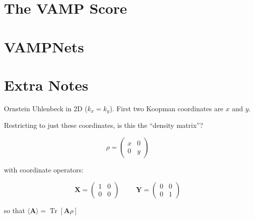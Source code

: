 \documentclass[]{article}
\newcommand{\bk}[1]{\left[ #1 \right]}
\newcommand{\w}[1]{\mathbf{#1}}
\DeclareMathOperator\Tr{Tr}
\begin{document}

\section{The VAMP Score}
\section{VAMPNets}
\section{Extra Notes}

Ornstein Uhlenbeck in 2D ($k_x=k_y$). First two Koopman coordinates are $x$ and $y$.

Restricting to just these coordinates, is this the ``density matrix''?

$$
\rho=\begin{pmatrix}
	x & 0 \\
	0 & y
\end{pmatrix}
$$

with coordinate operators:

$$
\w{X} = \begin{pmatrix}
	1 & 0 \\
	0 & 0
\end{pmatrix}
\hspace{1cm}
\w{Y} = \begin{pmatrix}
	0 & 0 \\
	0 & 1
\end{pmatrix}
$$

so that $\langle \w{A} \rangle = \Tr\bk{\w{A}\rho}$
\end{document}
